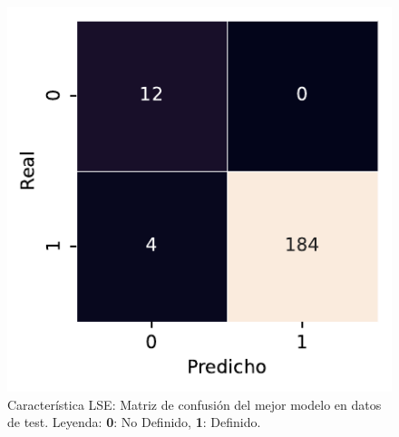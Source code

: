 \begin{figure}[htbp]
    \vspace{1.5em} %

    \includegraphics[width=0.6\linewidth]{figures/5_experiments/single-lse-cm.pdf}
    \caption[Característica LSE: Matriz de confusión del mejor modelo en datos de test.]{Característica LSE: Matriz de confusión del mejor modelo en datos de test. Leyenda: \textbf{0}: No Definido, \textbf{1}: Definido.}
    \label{fig5:LSE_confusion_matrix}
\end{figure}

